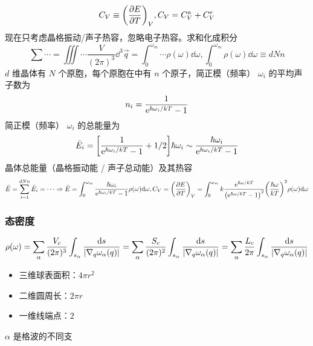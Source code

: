 \[ C_V \equiv \qty(\pdv{E}{T})_{V}, C_V = C_V^{a} + C_V^{e} \]
现在只考虑晶格振动/声子热容，忽略电子热容。求和化成积分
\[ \sum \cdots = \iiint \cdots \frac{V}{(2 \pi)^3} \dd^3 \vec{q} = \int_0^{\omega_m} \cdots \rho(\omega) \dd \omega, \int_0^{\omega_m} \rho(\omega) \dd \omega\equiv d N n \]
$d$ 维晶体有 $N$ 个原胞，每个原胞在中有 $n$ 个原子，简正模（频率） $\omega_i$ 的平均声子数为
\[ n_i = \frac{1}{\mathrm{e}^{\hbar \omega_i / k T} - 1} \]
简正模（频率） $\omega_i$ 的总能量为
\[ \bar{E}_i = \qty[\frac{1}{\mathrm{e}^{\hbar \omega_i / k T} - 1} + 1/2] \hbar \omega_i \sim \frac{\hbar \omega_i}{\mathrm{e}^{\hbar \omega_i / k T} - 1} \]
晶体总能量（晶格振动能 / 声子总动能）及其热容
\[ \bar{E} = \sum_{i = 1}^{d N n} \bar{E}_i = \cdots \Rightarrow \bar{E} = \int_0^{\omega_m} \frac{\hbar \omega_i}{\mathrm{e}^{\hbar \omega_i / k T} - 1} \rho(\omega) \dd \omega, C_V = \qty(\pdv{E}{T})_{V} = \int_0^{\omega_m} k \frac{\mathrm{e}^{\hbar \omega / k T}}{\qty(\mathrm{e}^{\hbar \omega / k T} - 1)^2} \qty(\frac{\hbar \omega}{k T})^2 \rho(\omega) \dd \omega \]

\subsubsection{态密度}

\[ \rho(\omega) = \sum_{\alpha} \frac{V_c}{(2 \pi)^3} \int_{s_\alpha} \frac{\dd s}{\abs{\nabla_q \omega_\alpha (q)}} = \sum_{\alpha} \frac{S_c}{(2 \pi)^2} \int_{s_\alpha} \frac{\dd s}{\abs{\nabla_q \omega_\alpha (q)}} = \sum_{\alpha} \frac{L_c}{2 \pi} \int_{s_\alpha} \frac{\dd s}{\abs{\nabla_q \omega_\alpha (q)}} \]

\begin{itemize}
    \item 三维球表面积：$4 \pi r^2$
    \item 二维圆周长：$2 \pi r$
    \item 一维线端点：$2$
\end{itemize}

$\alpha$ 是格波的不同支

